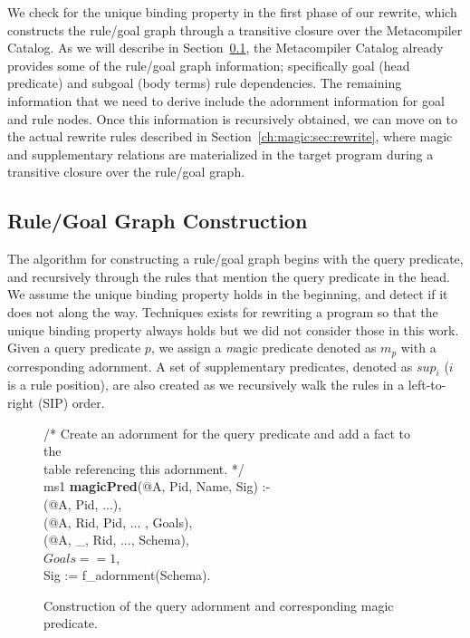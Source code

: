 We check for the unique binding property in the first phase of our rewrite,
which constructs the rule/goal graph through a transitive closure over the
Metacompiler Catalog.  As we will describe in
Section~\ref{ch:magic:sec:rgconstruct}, the Metacompiler Catalog already
provides some of the rule/goal graph information; specifically goal (head
predicate) and subgoal (body terms) rule dependencies.  The remaining
information that we need to derive include the adornment information for goal
and rule nodes.  Once this information is recursively obtained, we can move on
to the actual rewrite rules described in Section~\ref{ch:magic:sec:rewrite},
where magic and supplementary relations are materialized in the target program
during a transitive closure over the rule/goal graph.

\subsection{Rule/Goal Graph Construction}
\label{ch:magic:sec:rgconstruct}

The algorithm for constructing a rule/goal graph begins with the query
predicate, and recursively through the rules that mention the query predicate
in the head.  We assume the unique binding property holds in the beginning, and
detect if it does not along the way.  Techniques exists for rewriting a program
so that the unique binding property always holds but we did not consider those
in this work.  Given a query predicate $p$, we assign a {\emph magic predicate}
denoted as $m_p$ with a corresponding adornment.  A set of {\emph supplementary
predicates}, denoted as $sup_i$ ($i$ is a rule position), are also created as
we recursively walk the rules in a left-to-right (SIP) order.


\begin{figure}[!t]
\ssp
\centering
\begin{boxedminipage}{\linewidth}

/* Create an adornment for the query predicate and add a fact to the \\
 table referencing this adornment. */ \\
ms1 {\bf magicPred}(@A, Pid, Name, Sig) :- \\
(@A, Pid, ...), \\
(@A, Rid, Pid, ... , Goals), \\
(@A, \_, Rid, ..., Schema), \\
\datalogspace $Goals == 1$, \\
\datalogspace Sig := f\_adornment(Schema).
	
\end{boxedminipage}
\caption{\label{ch:magic:fig:magic1}Construction of the query adornment and corresponding magic predicate.}
\end{figure}

